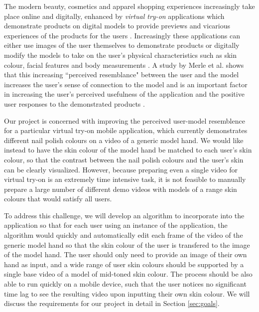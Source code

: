 The modern beauty, cosmetics and apparel shopping experiences increasingly take place online and digitally, enhanced by \textit{virtual try-on} applications which demonstrate products on digital models to provide previews and vicarious experiences of the products for the users \cite{zhang_2017_try}. Increasingly these applications can either use images of the user themselves to demonstrate products or digitally modify the models to take on the user's physical characteristics such as skin colour, facial features and body measurements \cite{shilkrot_2013_garment, li_2015_replace}. A study by Merle et al. shows that this increasing ``perceived resemblance" between the user and the model increases the user's sense of connection to the model and is an important factor in increasing the user's perceived usefulness of the application and the positive user responses to the demonstrated products \cite{merle_2012_tryon}.


Our project is concerned with improving the perceived user-model resemblence for a particular virtual try-on mobile application, which currently demonstrates different nail polish colours on a video of a generic model hand. We would like instead to have the skin colour of the model hand be matched to each user's skin colour, so that the contrast between the nail polish colours and the user's skin can be clearly visualized. However, because preparing even a single video for virtual try-on is an extremely time intensive task, it is not feasible to manually prepare a large number of different demo videos with models of a range skin colours that would satisfy all users.

To address this challenge, we will develop an algorithm to incorporate into the application so that for each user using an instance of the application, the algorithm would quickly and automatically edit each frame of the video of the generic model hand so that the skin colour of the user is transfered to the image of the model hand. The user should only need to provide an image of their own hand as input, and a wide range of user skin colours should be supported by a single base video of a model of mid-toned skin colour. The process should be also able to run quickly on a mobile device, such that the user notices no significant time lag to see the resulting video upon inputting their own skin colour. We will discuss the requirements for our project in detail in Section \ref{sec:goals}.

